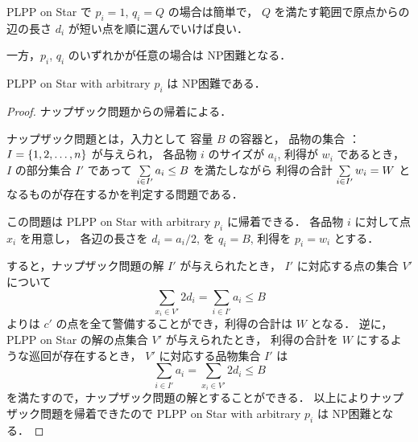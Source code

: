 PLPP on Star で $p_i = 1$, $q_i = Q$ の場合は簡単で，
\shuki $Q$ を満たす範囲で原点からの辺の長さ $d_i$ が短い点を順に選んでいけば良い．

一方，$p_i$, $q_i$ のいずれかが任意の場合は NP困難となる．




\begin{theo}
	PLPP on Star with arbitrary $p_i$ は NP困難である．
\end{theo}
\begin{proof}
ナップザック問題からの帰着による．

ナップザック問題とは，入力として
容量 $B$ の容器と，
品物の集合 ： $I = \left\{{ 1, 2, \ldots, n }\right\}$ が与えられ，
各品物 $i$ のサイズが $a_i$, 利得が $w_i$ であるとき，
$I$ の部分集合 $I'$ であって
$\sum\limits_{ i \in I'} a_i \leq B$ を満たしながら
利得の合計 $\sum\limits_{i \in I'} w_i = W$ となるものが存在するかを判定する問題である．

この問題は PLPP on Star with arbitrary $p_i$ に帰着できる．
各品物 $i$ に対して点 $x_i$ を用意し，
各辺の長さを $d_i = a_i/2$, \shuki を $q_i = B$, 利得を $p_i = w_i$ とする．

すると，ナップザック問題の解 $I'$ が与えられたとき，
$I'$ に対応する点の集合 $V'$ について
\begin{equation}
  \sum_{x_i \in V'} 2 d_i
= \sum_{i \in I'} a_i
\leq B
\end{equation}
より\server は $c'$ の点を全て警備することができ，利得の合計は $W$ となる．
逆に，PLPP on Star の解の点集合 $V'$ が与えられたとき，
利得の合計を $W$ にするような巡回が存在するとき，
$V'$ に対応する品物集合 $I'$ は
\begin{equation}
  \sum_{i \in I'} a_i
= \sum_{x_i \in V'} 2 d_i
\leq B
\end{equation}
を満たすので，ナップザック問題の解とすることができる．
以上によりナップザック問題を帰着できたので
PLPP on Star with arbitrary $p_i$ は NP困難となる．
\end{proof}





